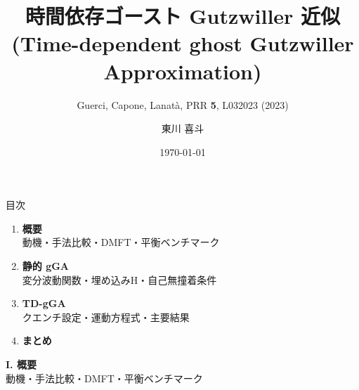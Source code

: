 \documentclass[12pt,aspectratio=169]{beamer}
\title[TD-gGA]{時間依存ゴースト Gutzwiller 近似\\
  \large (Time-dependent ghost Gutzwiller Approximation)}
\subtitle{Guerci, Capone, Lanat\`a, PRR \textbf{5}, L032023 (2023)}
\author{東川 喜斗}
\institute{埼玉大学}
\date{\today}
\begin{document}
\begin{frame}
  \titlepage
\end{frame}

\begin{frame}{目次}
  \begin{enumerate}\itemsep10pt
    \item \textbf{概要}\\
      {\small 動機・手法比較・DMFT・平衡ベンチマーク}
    \item \textbf{静的 gGA}\\
      {\small 変分波動関数・埋め込みH・自己無撞着条件}
    \item \textbf{TD-gGA}\\
      {\small クエンチ設定・運動方程式・主要結果}
    \item \textbf{まとめ}
  \end{enumerate}
\end{frame}

\begin{frame}[plain]
  \vfill
  \centering
  {\Large\textbf{I. 概要}}\\[8pt]
  {\small 動機・手法比較・DMFT・平衡ベンチマーク}
  \vfill
\end{frame}
\end{document}
